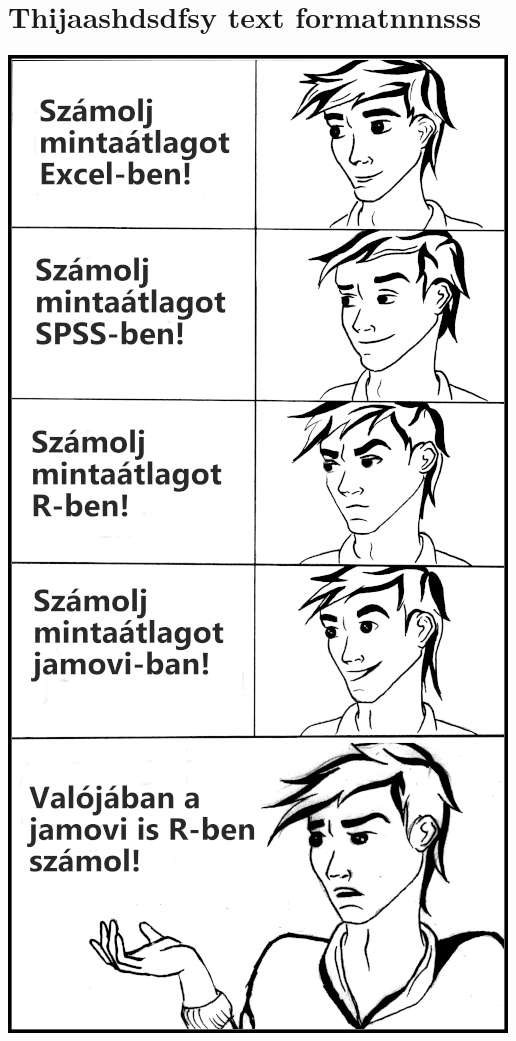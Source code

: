 \documentclass[
]{book}
\begin{document}
\hypertarget{thijaashdsdfsy-text-formatnnnsss}{%
\chapter{Thijaashdsdfsy text formatnnnsss}\label{thijaashdsdfsy-text-formatnnnsss}}

\begin{center}\includegraphics[width=0.9\linewidth]{images/ch_08_small} \end{center}
\end{document}
